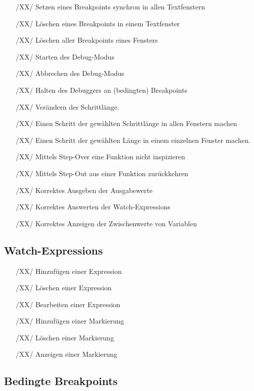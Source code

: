 \documentclass[parskip=full]{scrartcl}
\begin{document}
\begin{itemize}

	\item[/XX/] Setzen eines Breakpoints synchron in allen Textfenstern
	\item[/XX/] Löschen eines Breakpoints in einem Textfenster
	\item[/XX/] Löschen aller Breakpoints eines Fensters
	\item[/XX/] Starten des Debug-Modus
	\item[/XX/] Abbrechen des Debug-Modus
	\item[/XX/] Halten des Debuggers an (bedingten) Breakpoints
	\item[/XX/] Verändern der Schrittlänge.
	\item[/XX/] Einen Schritt der gewählten Schrittlänge in allen Fenstern machen
	\item[/XX/] Einen Schritt der gewählten Länge in einem einzelnen Fenster machen.
	\item[/XX/] Mittels Step-Over eine Funktion nicht inspizieren
	\item[/XX/] Mittels Step-Out aus einer Funktion zurückkehren
	\item[/XX/] Korrektes Ausgeben der Ausgabewerte
	\item[/XX/] Korrektes Auswerten der Watch-Expressions
	\item[/XX/] Korrektes Anzeigen der Zwischenwerte von Variablen
	
\end{itemize}


\subsection{Watch-Expressions}

\begin{itemize}

	\item[/XX/] Hinzufügen einer Expression
	\item[/XX/] Löschen einer Expression
	\item[/XX/] Bearbeiten einer Expression
	\item[/XX/] Hinzufügen einer Markierung
	\item[/XX/] Löschen einer Markierung
	\item[/XX/] Anzeigen einer Markierung
		
\end{itemize}

\subsection{Bedingte Breakpoints}
\end{document}
